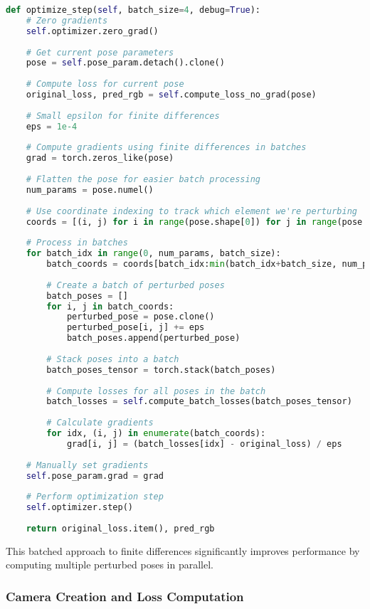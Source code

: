 \begin{lstlisting}[language=Python]
def optimize_step(self, batch_size=4, debug=True):
    # Zero gradients
    self.optimizer.zero_grad()
    
    # Get current pose parameters
    pose = self.pose_param.detach().clone()
    
    # Compute loss for current pose
    original_loss, pred_rgb = self.compute_loss_no_grad(pose)
    
    # Small epsilon for finite differences
    eps = 1e-4
    
    # Compute gradients using finite differences in batches
    grad = torch.zeros_like(pose)
    
    # Flatten the pose for easier batch processing
    num_params = pose.numel()
    
    # Use coordinate indexing to track which element we're perturbing
    coords = [(i, j) for i in range(pose.shape[0]) for j in range(pose.shape[1])]
    
    # Process in batches
    for batch_idx in range(0, num_params, batch_size):
        batch_coords = coords[batch_idx:min(batch_idx+batch_size, num_params)]
        
        # Create a batch of perturbed poses
        batch_poses = []
        for i, j in batch_coords:
            perturbed_pose = pose.clone()
            perturbed_pose[i, j] += eps
            batch_poses.append(perturbed_pose)
        
        # Stack poses into a batch
        batch_poses_tensor = torch.stack(batch_poses)
        
        # Compute losses for all poses in the batch
        batch_losses = self.compute_batch_losses(batch_poses_tensor)
        
        # Calculate gradients
        for idx, (i, j) in enumerate(batch_coords):
            grad[i, j] = (batch_losses[idx] - original_loss) / eps
    
    # Manually set gradients
    self.pose_param.grad = grad
    
    # Perform optimization step
    self.optimizer.step()
    
    return original_loss.item(), pred_rgb
\end{lstlisting}

This batched approach to finite differences significantly improves performance by computing multiple perturbed poses in parallel.

\subsubsection{Camera Creation and Loss Computation}

